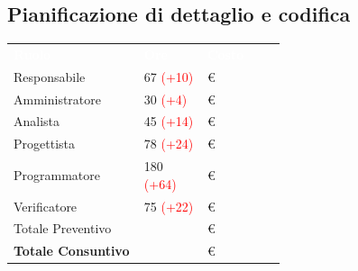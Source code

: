 \subsection{Pianificazione di dettaglio e codifica}
{\renewcommand{\arraystretch}{2.0}
    \begin{center}
        \begin{tabular}{P{0.25\linewidth}P{0.15\linewidth}P{0.20\linewidth}}
            \textcolor{white}{\textbf{Ruolo}} & \textcolor{white}{\textbf{Ore}} & \textcolor{white}{\textbf{Costo}}\\
            Responsabile & 67 \textcolor{red}{(+10)} & \euro \\
                
            Amministratore & 30 \textcolor{red}{(+4)} & \euro \\
    
            Analista & 45 \textcolor{red}{(+14)} & \euro \\
    
            Progettista &  78 \textcolor{red}{(+24)} & \euro \\
    
            Programmatore & 180 \textcolor{red}{(+64)} & \euro \\
    
            Verificatore & 75  \textcolor{red}{(+22)}& \euro \\
    
            \hline\hline
    
            Totale Preventivo &  & \euro\\
    
            \textbf{Totale Consuntivo} &   & \euro \\
        \end{tabular}
    \end{center}    
}
